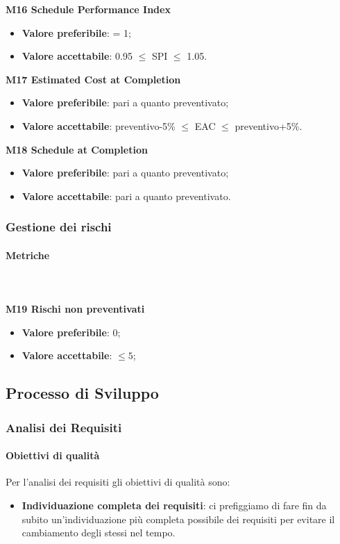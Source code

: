 				\textbf{M16 Schedule Performance Index}
				\begin{itemize}
					\item \textbf{Valore preferibile}: = 1;
					\item \textbf{Valore accettabile}: 0.95 $\le$ SPI $\le$ 1.05.
				\end{itemize}
				\textbf{M17 Estimated Cost at Completion}
				\begin{itemize}
					\item \textbf{Valore preferibile}: pari a quanto preventivato;
					\item \textbf{Valore accettabile}: preventivo-5\% $\le$ EAC $\le$ preventivo+5\%.
				\end{itemize}
				\textbf{M18 Schedule at Completion}
				\begin{itemize}
					\item \textbf{Valore preferibile}: pari a quanto preventivato;
					\item \textbf{Valore accettabile}: pari a quanto preventivato.
				\end{itemize}
			
		\subsubsection{Gestione dei rischi} 
			\paragraph{Metriche} \mbox{} \\ \\
			\textbf{M19 Rischi non preventivati} 
			\begin{itemize}
				\item \textbf{Valore preferibile}: 0;
				\item \textbf{Valore accettabile}: $ \le 5$;
			\end{itemize}
				
											
	\subsection{Processo di Sviluppo}
		\subsubsection{Analisi dei Requisiti} 
			\paragraph{Obiettivi di qualità}
			Per l'analisi dei requisiti gli obiettivi di qualità sono:
			\begin{itemize}
				\item \textbf{Individuazione completa dei requisiti}: ci prefiggiamo di fare fin da subito un'individuazione più completa possibile dei requisiti per evitare il cambiamento degli stessi nel tempo.
			\end{itemize}
